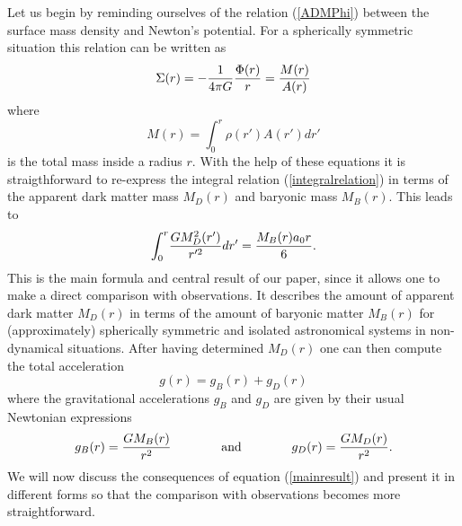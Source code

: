 \documentclass[a4paper,12pt]{article}
\begin{document}
Let us begin by reminding ourselves of the relation (\ref{ADMPhi}) between the surface mass density and Newton's potential. For a spherically symmetric situation this relation can be written as  
\begin{equation}
\Sigma(r) = - {1\over 4\pi G} {\Phi(r)\over r} = {M(r)\over A(r)} 
\end{equation}
where 
\begin{equation}
M(r) = \int^r_0\!\rho(r') A(r') dr' 
\end{equation}
is the total mass inside a radius $r$.  With the help of these equations it is straigthforward to re-express the integral relation  (\ref{integralrelation}) in terms of the apparent dark matter mass $M_D(r)$ and baryonic mass $M_B(r)$. This leads to 
\begin{equation}
\label{mainresult}
\int_0^r\! {GM^2_D(r')\over r'^2} dr' = {M_B(r) a_0 r\over 6}. 
\end{equation}
This is the main formula and central result of our paper, since it allows one to make a direct comparison with observations. It describes the amount of apparent dark matter $M_D(r)$ in terms of the amount of baryonic matter $M_B(r)$ for (approximately) spherically symmetric and isolated astronomical systems in non-dynamical situations. 
After having determined $M_{D}(r)$ one can then compute the total acceleration
\begin{equation}
g(r) = g_B(r) + g_D(r)	
\end{equation}
where the gravitational accelerations $g_B$ and $g_D$ are given by their usual Newtonian expressions
\begin{equation} 
g_{B}(r)= {GM_{B}(r)\over r^2}
\qquad \qquad\mbox{and}\qquad\qquad g_D(r)= {GM_D(r)\over r^2}  .
\end{equation}
 We will now discuss the consequences of equation (\ref{mainresult}) and present it in different forms so that the comparison with observations becomes more straightforward.  
\end{document}
